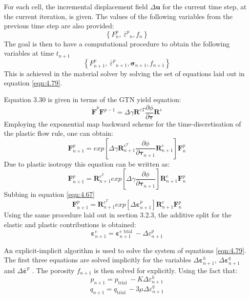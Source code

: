 \documentclass[sn-mathphys,Numbered,draft]{sn-jnl}%
\begin{document}
For each cell, the incremental displacement field $\Delta\mathbf{u}$ for the current time step, at the current iteration, is given. The values of the following variables from the previous time step are also provided:
\begin{equation}
\left\{F_n^p,\ {{\bar{\varepsilon}}^p}_n,f_n\right\}
\end{equation}
The goal is then to have a computational procedure to obtain the following variables at time $t_{n+1}$
\begin{equation}
\left\{F_{n+1}^p,\ {{\bar{\varepsilon}}^p}_{n+1},\boldsymbol{\sigma}_{n+1},f_{n+1}\right\}
\end{equation}
This is achieved in the material solver by solving the set of equations laid out in equation \ref{eqn:4.79}.

Equation 3.30 is given in terms of the GTN yield equation:
\begin{equation}
	{\dot{\mathbf{F}}}^p\mathbf{F}^{p-1}=\Delta\gamma\mathbf{R}^{eT}\frac{\partial\phi}{\partial\boldsymbol{\tau}}\mathbf{R}^e
\end{equation}
Employing the exponential map backward scheme for the time-discretisation of the plastic flow rule, one can obtain:
\begin{equation}
	\mathbf{F}_{n+1}^p=exp\left[\Delta\gamma\mathbf{R}_{n+1}^{e^T}\frac{\partial\phi}{\partial\boldsymbol{\tau}_{n+1}}\mathbf{R}_{n+1}^e\right]\mathbf{F}_n^p
\end{equation}
Due to plastic isotropy this equation can be written as:
\begin{equation}
	\mathbf{F}_{n+1}^p=\mathbf{R}_{n+1}^{e^T}exp\left[\Delta\gamma\frac{\partial\phi}{\partial\boldsymbol{\tau}_{n+1}}\right]\mathbf{R}_{n+1}^e\mathbf{F}_n^p
\end{equation}
Subbing in equation \ref{eqn:4.67}
\begin{equation}	\mathbf{F}_{n+1}^p=\mathbf{R}_{n+1}^{e^T}exp\left[\Delta{\boldsymbol{\varepsilon}}^p_{n+1}\right]\mathbf{R}_{n+1}^e\mathbf{F}_n^p	
\end{equation}
Using the same procedure laid out in section 3.2.3, the additive split for the elastic and plastic contributions is obtained:
\begin{equation}
\boldsymbol{\varepsilon}_{n+1}^e=\boldsymbol{\varepsilon}_{n+1}^{e \text { trial }}-\Delta \varepsilon_{n+1}^p
\end{equation}

An explicit-implicit algorithm is used to solve the system of equations \ref{eqn:4.79}. The first three equations are solved implicitly for the variables $\Delta \boldsymbol{\varepsilon}_{n+1}^h$, $\Delta \boldsymbol{\varepsilon}_{n+1}^q$ and $\Delta \overline{\boldsymbol{\varepsilon}}^p$
. The porosity $f_{n+1}$ is then solved for explicitly. 
Using the fact that:
\begin{equation}
p_{n+1}=p_{\text {trial }}-K \Delta \varepsilon_{n+1}^h 
\end{equation}
\begin{equation}
q_{n+1}=q_{\text {trial }}-3 \mu \Delta \varepsilon_{n+1}^q
\end{equation}
\end{document}
